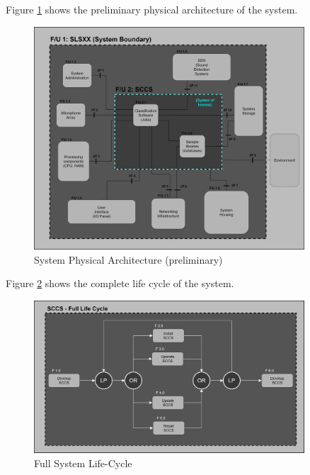 \documentclass[a4paper,12pt]{article}
\numberwithin{equation}{section}
\numberwithin{figure}{section}
\numberwithin{table}{section}
\begin{document}
Figure \ref{prelim_physArch} shows the preliminary physical architecture of the system.

\begin{figure}[h!]
    \centering %
    \includegraphics[padding=1ex,width=0.9\textwidth,frame]{img/prelim_physArch.png}
    \caption{System Physical Architecture (preliminary)}
    \label{prelim_physArch}
\end{figure}



Figure \ref{prelim_functFlow_full_life_cycle} shows the complete life cycle of the system.

\begin{figure}[h!]
    \centering %
    \includegraphics[padding=1ex,width=0.9\textwidth,frame]{img/prelim_functFlow_full_life_cycle.png}
    \caption{Full System Life-Cycle}
    \label{prelim_functFlow_full_life_cycle}
\end{figure}
\end{document}
